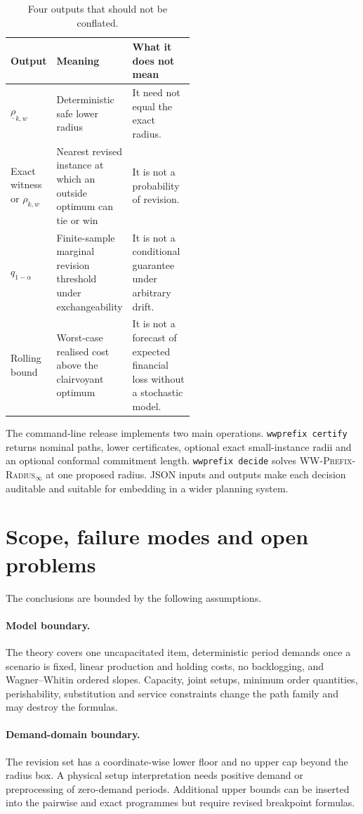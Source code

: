 \documentclass[11pt]{article}
\theoremstyle{definition}
\newcommand{\WWR}{\textsc{WW-Prefix-Radius}\ensuremath{_{\infty}}}
\begin{document}
\begin{table}[h]
\centering
\caption{Four outputs that should not be conflated.}
\label{tab:outputs}
\begin{tabularx}{0.96\linewidth}{@{}p{0.24\linewidth}p{0.28\linewidth}X@{}}
\toprule
Output & Meaning & What it does not mean \\
\midrule
$\underline\rho_{k,w}$ & Deterministic safe lower radius & It need not equal the exact radius. \\
Exact witness or $\rho_{k,w}$ & Nearest revised instance at which an outside optimum can tie or win & It is not a probability of revision. \\
$q_{1-\alpha}$ & Finite-sample marginal revision threshold under exchangeability & It is not a conditional guarantee under arbitrary drift. \\
Rolling bound & Worst-case realised cost above the clairvoyant optimum & It is not a forecast of expected financial loss without a stochastic model. \\
\bottomrule
\end{tabularx}
\end{table}

The command-line release implements two main operations. \texttt{wwprefix certify} returns nominal paths, lower certificates, optional exact small-instance radii and an optional conformal commitment length. \texttt{wwprefix decide} solves \WWR{} at one proposed radius. JSON inputs and outputs make each decision auditable and suitable for embedding in a wider planning system.

\section{Scope, failure modes and open problems}

The conclusions are bounded by the following assumptions.

\paragraph{Model boundary.}
The theory covers one uncapacitated item, deterministic period demands once a scenario is fixed, linear production and holding costs, no backlogging, and Wagner--Whitin ordered slopes. Capacity, joint setups, minimum order quantities, perishability, substitution and service constraints change the path family and may destroy the formulas.

\paragraph{Demand-domain boundary.}
The revision set has a coordinate-wise lower floor and no upper cap beyond the radius box. A physical setup interpretation needs positive demand or preprocessing of zero-demand periods. Additional upper bounds can be inserted into the pairwise and exact programmes but require revised breakpoint formulas.
\end{document}
